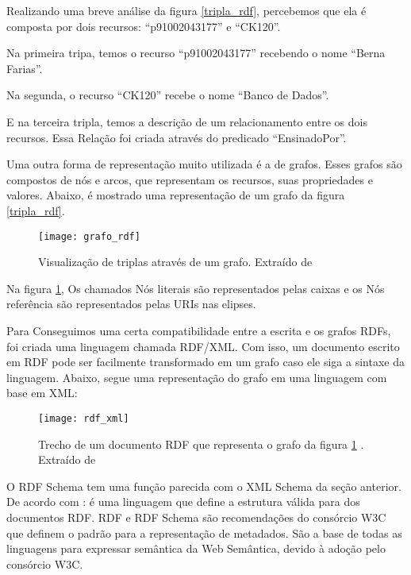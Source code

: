 Realizando uma breve análise da figura \ref{tripla_rdf}, percebemos que ela é composta por dois recursos: “p91002043177” e “CK120”.

Na primeira tripa, temos o recurso “p91002043177” recebendo o nome “Berna Farias”.

Na segunda, o recurso “CK120” recebe o nome “Banco de Dados”.

E na terceira tripla, temos a descrição de um relacionamento entre os dois recursos. Essa Relação foi criada através do predicado “EnsinadoPor”.

Uma outra forma de representação muito utilizada é a de grafos. Esses grafos são compostos de nós e arcos, que representam os recursos, suas propriedades e valores. Abaixo, é mostrado uma representação de um grafo da figura \ref{tripla_rdf}.

\graphicspath{{figuras/}}
\begin{figure}[H]
	\centering
	\texttt{[image: grafo\_rdf]}
	\caption[Visualização de triplas através de um grafo.]{Visualização de triplas através de um grafo. Extraído de \cite{filholoscio}}
	\label{grafo_rdf}
\end{figure}

Na figura \ref{grafo_rdf}, Os chamados Nós literais são representados pelas caixas e os Nós referência são representados pelas URIs nas elipses. 

Para Conseguimos uma certa compatibilidade entre a escrita e os grafos RDFs, foi criada uma linguagem chamada RDF/XML. Com isso, um documento escrito em RDF pode ser facilmente transformado em um grafo caso ele siga a sintaxe da linguagem. Abaixo, segue uma representação do grafo em uma linguagem com base em XML:

\graphicspath{{figuras/}}
\begin{figure}[H]
	\centering
	\texttt{[image: rdf\_xml]}
	\caption[Trecho de um documento RDF que representa o grafo da figura \ref{grafo_rdf}. ]{Trecho de um documento RDF que representa o grafo da figura \ref{grafo_rdf} . Extraído de \cite{filholoscio}}
	\label{rdf_xml}
\end{figure}

O RDF Schema tem uma função parecida com o XML Schema da seção anterior. De acordo com \cite{rosa}: é uma linguagem que define a estrutura válida para dos documentos RDF. RDF e RDF Schema são recomendações do consórcio W3C que definem o padrão para a representação de metadados. São a base de todas as linguagens para expressar semântica da Web Semântica, devido à adoção pelo consórcio W3C.
	
